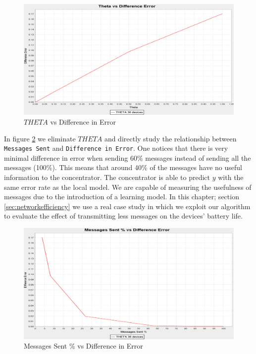 \documentclass{mproj}
\begin{document}
\begin{figure}[H]
\caption{$THETA$ vs Difference in Error}
\label{fig:ThetaDE}
\centerline{\includegraphics[scale=0.4]{ThetaDE}}
\end{figure}

In figure \ref{fig:MessagesDe} we eliminate $THETA$ and directly study the relationship between \texttt{Messages Sent} and \texttt{Difference in Error}. One notices that there is very minimal difference in error when sending 60\% messages instead of sending all the messages (100\%). This means that around 40\% of the messages have no useful information to the concentrator. The concentrator is able to predict $y$ with the same error rate as the local model. We are capable of measuring the usefulness of messages due to the introduction of a learning model. In this chapter; section \ref{sec:networkefficiency} we use a real case study in which we exploit our algorithm to evaluate the effect of transmitting less messages on the devices' battery life.

\begin{figure}[H]
\caption{Messages Sent \% vs Difference in Error}
\label{fig:MessagesDe}
\centerline{\includegraphics[scale=0.4]{MessagesDe}}
\end{figure}
\end{document}
